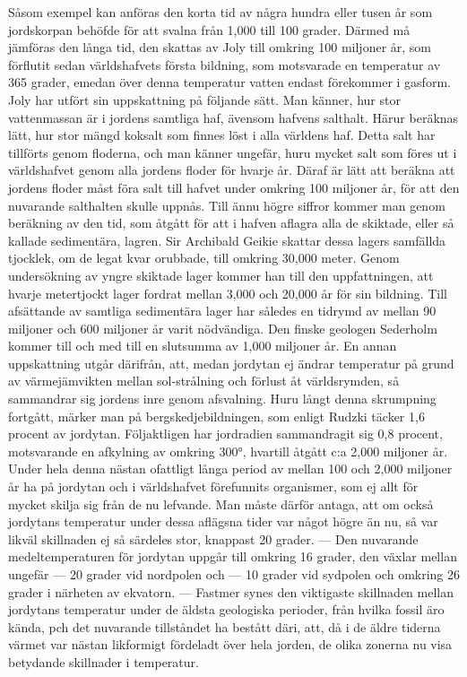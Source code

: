 \documentclass[a4paper, 12pt, oneside, swedish]{article}
\begin{document}
Såsom exempel kan anföras den korta tid av några hundra eller tusen år som jordskorpan behöfde för att svalna från 1,000 till 100 grader. Därmed må jämföras den långa tid, den skattas av Joly till omkring 100 miljoner år, som förflutit sedan världshafvets första bildning, som motsvarade en temperatur av 365 grader, emedan över denna temperatur vatten endast förekommer i gasform. Joly har utfört sin uppskattning på följande sätt. Man känner, hur stor vattenmassan är i jordens samtliga haf, ävensom hafvens salthalt. Härur beräknas lätt, hur stor mängd koksalt som finnes löst i alla världens haf. Detta salt har tillförts genom floderna, och man känner ungefär, huru mycket salt som föres ut i världshafvet genom alla jordens floder för hvarje år. Däraf är lätt att beräkna att jordens floder måst föra salt till hafvet under omkring 100 miljoner år, för att den nuvarande salthalten skulle uppnås. Till ännu högre siffror kommer man genom beräkning av den tid, som åtgått för att i hafven aflagra alla de skiktade, eller så kallade sedimentära, lagren. Sir Archibald Geikie skattar dessa lagers samfällda tjocklek, om de legat kvar orubbade, till omkring 30,000 meter. Genom undersökning av yngre skiktade lager kommer han till den uppfattningen, att hvarje metertjockt lager fordrat mellan 3,000 och 20,000 år för sin bildning. Till afsättande av samtliga sedimentära lager har således en tidrymd av mellan 90 miljoner och 600 miljoner år varit nödvändiga. Den finske geologen Sederholm kommer till och med till en slutsumma av 1,000 miljoner år. En annan uppskattning utgår därifrån, att, medan jordytan ej ändrar temperatur på grund av värmejämvikten mellan sol-strålning och förlust åt världsrymden, så sammandrar sig jordens inre genom afsvalning. Huru långt denna skrumpning fortgått, märker man på bergskedjebildningen, som enligt Rudzki täcker 1,6 procent av jordytan. Följaktligen har jordradien sammandragit sig 0,8 procent, motsvarande en afkylning av omkring 300°, hvartill åtgått c:a 2,000 miljoner år. Under hela denna nästan ofattligt långa period av mellan 100 och 2,000 miljoner år ha på jordytan och i världshafvet förefunnits organismer, som ej allt för mycket skilja sig från de nu lefvande. Man måste därför antaga, att om också jordytans temperatur under dessa aflägsna tider var något högre än nu, så var likväl skillnaden ej så särdeles stor, knappast 20 grader. --- Den nuvarande medeltemperaturen för jordytan uppgår till omkring 16 grader, den växlar mellan ungefär --- 20 grader vid nordpolen och --- 10 grader vid sydpolen och omkring 26 grader i närheten av ekvatorn. --- Fastmer synes den viktigaste skillnaden mellan jordytans temperatur under de äldsta geologiska perioder, från hvilka fossil äro kända, pch det nuvarande tillståndet ha bestått däri, att, då i de äldre tiderna värmet var nästan likformigt fördeladt över hela jorden, de olika zonerna nu visa betydande skillnader i temperatur.
\end{document}
